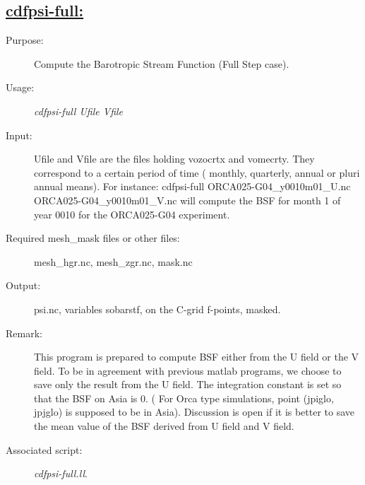 \documentclass[a4paper,11pt]{article}
\begin{document}
\subsection*{\underline{cdfpsi-full:}}
\begin{description}
\item[Purpose:] Compute the Barotropic Stream Function  (Full Step case).
\item[Usage:] {\em cdfpsi-full  Ufile Vfile }
\item[Input:] Ufile and Vfile are the files holding vozocrtx and vomecrty.
They correspond to a certain period of time ( monthly, quarterly, annual or
pluri annual means). 
For instance: cdfpsi-full ORCA025-G04\_y0010m01\_U.nc ORCA025-G04\_y0010m01\_V.nc 
will compute the BSF for month 1 of year 0010 for the ORCA025-G04 experiment.
\item[Required mesh\_mask files or other files:]   mesh\_hgr.nc, mesh\_zgr.nc, mask.nc  \\
\item[Output:]psi.nc, variables sobarstf, on the C-grid f-points, masked.
\item[Remark:]  This program is prepared to compute BSF either from the U field or the V field. To be in agreement with previous
matlab programs, we choose to save only the result from the U field. The integration constant is set so that the BSF
on Asia is 0. ( For Orca type simulations, point (jpiglo, jpjglo) is supposed to be in Asia). Discussion is open if it
is better to save the mean value of the BSF derived from U field and V field. 
\item[Associated script:] {\em cdfpsi-full.ll}. 
\end{description}

\newpage
\end{document}
